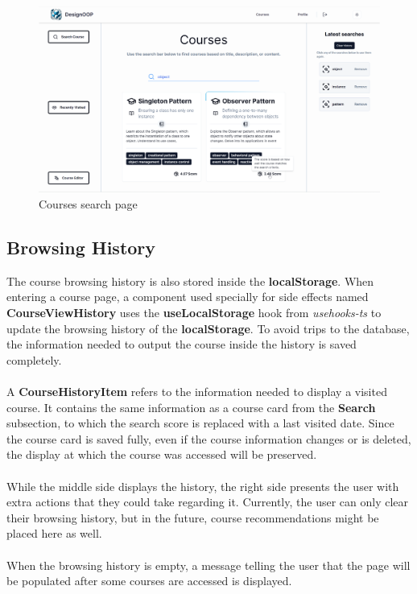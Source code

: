 \begin{figure}[h]
    \centering
    \includegraphics[scale=0.33]{images/search-page-preview.png}
    \caption{Courses search page}
    \label{fig:search-page}
\end{figure}

\subsection{Browsing History}

\noindent The course browsing history is also stored inside the \textbf{localStorage}. When entering a course page, a component used specially for side effects named \textbf{CourseViewHistory} uses the \textbf{useLocalStorage} hook from \textit{usehooks-ts} to update the browsing history of the \textbf{localStorage}. To avoid trips to the database, the information needed to output the course inside the history is saved completely.
\\\\
\noindent A \textbf{CourseHistoryItem} refers to the information needed to display a visited course. It contains the same information as a course card from the \textbf{Search} subsection, to which the search score is replaced with a last visited date. Since the course card is saved fully, even if the course information changes or is deleted, the display at which the course was accessed will be preserved.
\\\\
\noindent While the middle side displays the history, the right side presents the user with extra actions that they could take regarding it. Currently, the user can only clear their browsing history, but in the future, course recommendations might be placed here as well.
\\\\
\noindent When the browsing history is empty, a message telling the user that the page will be populated after some courses are accessed is displayed.


